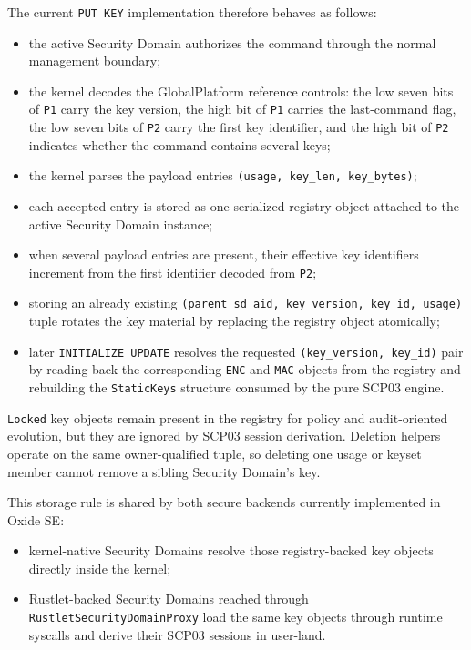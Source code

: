 The current \texttt{PUT KEY} implementation therefore behaves as follows:
\begin{itemize}
\item the active Security Domain authorizes the command through the normal
      management boundary;
\item the kernel decodes the GlobalPlatform reference controls: the low seven
      bits of \texttt{P1} carry the key version, the high bit of \texttt{P1}
      carries the last-command flag, the low seven bits of \texttt{P2} carry
      the first key identifier, and the high bit of \texttt{P2} indicates
      whether the command contains several keys;
\item the kernel parses the payload entries
      \texttt{(usage, key\_len, key\_bytes)};
\item each accepted entry is stored as one serialized registry object attached
      to the active Security Domain instance;
\item when several payload entries are present, their effective key
      identifiers increment from the first identifier decoded from
      \texttt{P2};
\item storing an already existing
      \texttt{(parent\_sd\_aid, key\_version, key\_id, usage)} tuple rotates
      the key material by replacing the registry object atomically;
\item later \texttt{INITIALIZE UPDATE} resolves the requested
      \texttt{(key\_version, key\_id)} pair by reading back the corresponding
      \texttt{ENC} and \texttt{MAC} objects from the registry and rebuilding
      the \texttt{StaticKeys} structure consumed by the pure SCP03 engine.
\end{itemize}

\texttt{Locked} key objects remain present in the registry for policy and
audit-oriented evolution, but they are ignored by SCP03 session derivation.
Deletion helpers operate on the same owner-qualified tuple, so deleting one
usage or keyset member cannot remove a sibling Security Domain's key.

This storage rule is shared by both secure backends currently implemented in
Oxide SE:
\begin{itemize}
\item kernel-native Security Domains resolve those registry-backed key objects
      directly inside the kernel;
\item Rustlet-backed Security Domains reached through
      \texttt{RustletSecurityDomainProxy} load the same key objects through
      runtime syscalls and derive their SCP03 sessions in user-land.
\end{itemize}

